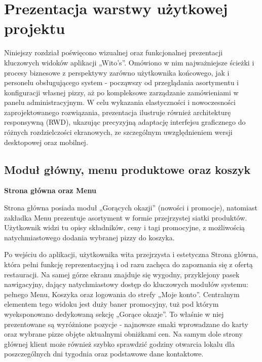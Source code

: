 \chapter{Prezentacja warstwy użytkowej projektu}
Niniejszy rozdział poświęcono wizualnej oraz funkcjonalnej prezentacji kluczowych widoków aplikacji „Wito’s”. Omówiono w nim najważniejsze ścieżki i procesy biznesowe z perspektywy zarówno użytkownika końcowego, jak i personelu obsługującego system - począwszy od przeglądania asortymentu i konfiguracji własnej pizzy, aż po kompleksowe zarządzanie zamówieniami w panelu administracyjnym. W celu wykazania elastyczności i nowoczesności zaprojektowanego rozwiązania, prezentacja ilustruje również architekturę responsywną (RWD), ukazując precyzyjną adaptację interfejsu graficznego do różnych rozdzielczości ekranowych, ze szczególnym uwzględnieniem wersji desktopowej oraz mobilnej.

\section{Moduł główny, menu produktowe oraz koszyk}

\textbf{Strona główna oraz Menu} 
\vspace{5pt}

Strona główna posiada moduł „Gorących okazji” (nowości i promocje), natomiast zakładka Menu prezentuje asortyment w formie przejrzystej siatki produktów. Użytkownik widzi tu opisy składników, ceny i tagi promocyjne, z możliwością natychmiastowego dodania wybranej pizzy do koszyka.

\vspace{15pt}

Po wejściu do aplikacji, użytkownika wita przejrzysta i estetyczna Strona główna, która pełni funkcję reprezentacyjną i od razu zachęca do zapoznania się z ofertą restauracji. Na samej górze ekranu znajduje się wygodny, przyklejony pasek nawigacyjny, dający natychmiastowy dostęp do kluczowych modułów systemu: pełnego Menu, Koszyka oraz logowania do strefy „Moje konto”. Centralnym elementem tego widoku jest duży baner promocyjny, tuż pod którym wyeksponowano dedykowaną sekcję „Gorące okazje”. To właśnie w niej prezentowane są wyróżnione pozycje - najnowsze smaki wprowadzane do karty oraz wybrane pizze objęte aktualnymi obniżkami cen. Na samym dole strony głównej klient może również szybko sprawdzić godziny otwarcia lokalu dla poszczególnych dni tygodnia oraz podstawowe dane kontaktowe.

\vspace{5pt}

